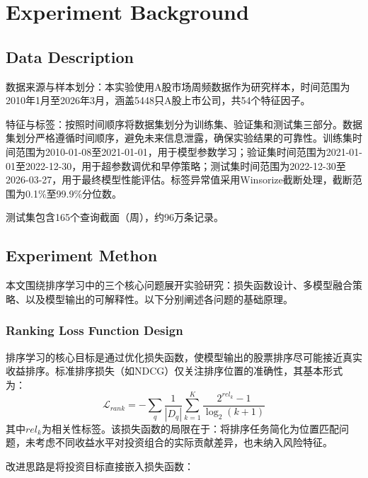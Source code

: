 \documentclass[11pt,a4paper]{ctexart}
\begin{document}
\section{Experiment Background}

\subsection{Data Description}

数据来源与样本划分：本实验使用A股市场周频数据作为研究样本，时间范围为2010年1月至2026年3月，涵盖5448只A股上市公司，共54个特征因子。

特征与标签：按照时间顺序将数据集划分为训练集、验证集和测试集三部分。数据集划分严格遵循时间顺序，避免未来信息泄露，确保实验结果的可靠性。训练集时间范围为2010-01-08至2021-01-01，用于模型参数学习；验证集时间范围为2021-01-01至2022-12-30，用于超参数调优和早停策略；测试集时间范围为2022-12-30至2026-03-27，用于最终模型性能评估。标签异常值采用Winsorize截断处理，截断范围为0.1\%至99.9\%分位数。

测试集包含165个查询截面（周），约96万条记录。


\subsection{Experiment Methon}


本文围绕排序学习中的三个核心问题展开实验研究：损失函数设计、多模型融合策略、以及模型输出的可解释性。以下分别阐述各问题的基础原理。

\subsubsection{Ranking Loss Function Design}
\label{subsec:loss_design}

排序学习的核心目标是通过优化损失函数，使模型输出的股票排序尽可能接近真实收益排序。标准排序损失（如NDCG）仅关注排序位置的准确性，其基本形式为：
\begin{equation}
\mathcal{L}_{rank} = -\sum_{q} \frac{1}{|D_q|} \sum_{k=1}^{K} \frac{2^{rel_k} - 1}{\log_2(k+1)}
\label{eq:ndcg}
\end{equation}
其中$rel_k$为相关性标签。该损失函数的局限在于：将排序任务简化为位置匹配问题，未考虑不同收益水平对投资组合的实际贡献差异，也未纳入风险特征。

改进思路是将投资目标直接嵌入损失函数：
\end{document}
